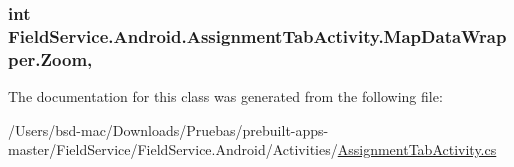 \hypertarget{class_field_service_1_1_android_1_1_assignment_tab_activity_1_1_map_data_wrapper_ab671c8fd695d3f85cf790445df7d0b58}{
\subsubsection[{Zoom}]{\setlength{\rightskip}{0pt plus 5cm}int Field\+Service.\+Android.\+Assignment\+Tab\+Activity.\+Map\+Data\+Wrapper.\+Zoom\hspace{0.3cm}{\ttfamily [get]}, {\ttfamily [set]}}}\label{class_field_service_1_1_android_1_1_assignment_tab_activity_1_1_map_data_wrapper_ab671c8fd695d3f85cf790445df7d0b58}


The documentation for this class was generated from the following file\+:\begin{DoxyCompactItemize}
\item 
/\+Users/bsd-\/mac/\+Downloads/\+Pruebas/prebuilt-\/apps-\/master/\+Field\+Service/\+Field\+Service.\+Android/\+Activities/\hyperlink{_assignment_tab_activity_8cs}{Assignment\+Tab\+Activity.\+cs}\end{DoxyCompactItemize}
